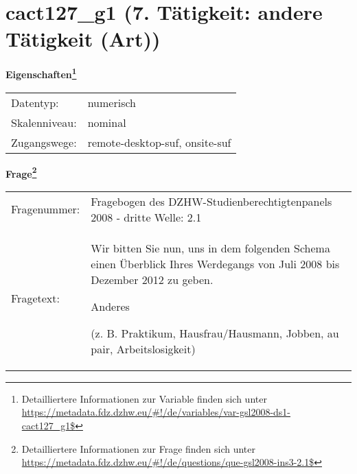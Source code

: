
    \setcounter{footnote}{0}

    \vspace*{-1.8cm}
	\section{cact127\_g1 (7. Tätigkeit: andere Tätigkeit (Art))}
	\label{section:cact127_g1}



    \vspace*{0.5cm}
    \noindent\textbf{Eigenschaften\footnote{Detailliertere Informationen zur Variable finden sich unter
		\url{https://metadata.fdz.dzhw.eu/\#!/de/variables/var-gsl2008-ds1-cact127_g1$}}}\\
	\begin{tabularx}{\hsize}{@{}lX}
	Datentyp: & numerisch \\
	Skalenniveau: & nominal \\
	Zugangswege: &
	  remote-desktop-suf, 
	  onsite-suf
 \\
    \end{tabularx}



				\vspace*{0.5cm}
                \noindent\textbf{Frage\footnote{Detailliertere Informationen zur Frage finden sich unter
		              \url{https://metadata.fdz.dzhw.eu/\#!/de/questions/que-gsl2008-ins3-2.1$}}}\\
				\begin{tabularx}{\hsize}{@{}lX}
					Fragenummer: &
					  Fragebogen des DZHW-Studienberechtigtenpanels 2008 - dritte Welle:
					  2.1
 \\
					Fragetext: & Wir bitten Sie nun, uns in dem folgenden Schema einen Überblick Ihres Werdegangs von Juli 2008 bis Dezember 2012 zu geben.\par  Anderes\par  (z. B. Praktikum, Hausfrau/Hausmann, Jobben, au pair, Arbeitslosigkeit) \\
				\end{tabularx}





